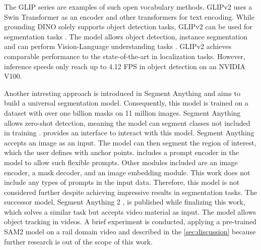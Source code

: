 The GLIP series \cite{GLIPv12022} \cite{glipv22022} are examples of such open vocabulary methods.
GLIPv2 uses a Swin Transformer \cite{swinTransformer2021} as an encoder and other transformers for text encoding.
While grounding DINO solely supports object detection tasks, GLIPv2 can be used for segmentation tasks \cite{groundingdino2024}.
The model allows object detection, instance segmentation and can perform Vision-Language understanding tasks \cite{glipv22022}.
GLIPv2 achieves comparable performance to the state-of-the-art in localization tasks.
However, inference speeds only reach up to 4.12 FPS in object detection on an NVIDIA V100.

\vspace{0.5cm}

Another intresting approach is introduced in Segment Anything \cite{segmentAnything2023} and aims to build a universal segmentation model.
Consequently, this model is trained on a dataset with over one billion masks on 11 million images.
Segment Anything \cite{segmentAnything2023} allows zero-shot detection, meaning the model can segment classes not included in training \cite{segmentAnything2023} \cite{openvocabularysurvey2024}.
\cite{segmentAnythingOnline} provides an interface to interact with this model.
Segment Anything accepts an image as an input.
The model can then segment the region of interest, which the user defines with anchor points.
\cite{segmentAnything2023} includes a prompt encoder in the model to allow such flexible prompts.
Other modules included are an image encoder, a mask decoder, and an image embedding module.
This work does not include any types of prompts in the input data.
Therefore, this model is not considered further despite achieving impressive results in segmentation tasks.
The successor model, Segment Anything 2 \cite{segmentAnything22024}, is published while finalizing this work, which solves a similar task but accepts video material as input.
The model allows object tracking in videos.
A brief experiment is conducted, applying a pre-trained SAM2 model on a rail domain video and described in the \autoref{sec:discussion} because further research is out of the scope of this work.

